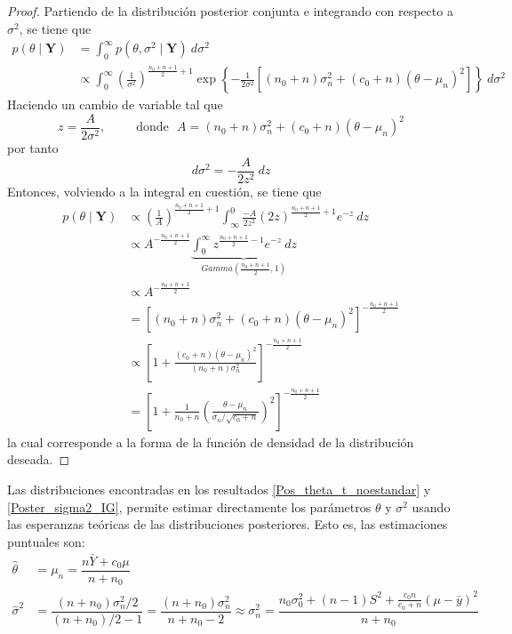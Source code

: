 \begin{proof}
Partiendo de la distribución posterior conjunta e integrando con respecto a $\sigma^2$, se tiene que
\begin{align*}
p(\theta \mid \mathbf{Y})&= \int_0^{\infty} p(\theta,\sigma^2 \mid \mathbf{Y}) \ d\sigma^2 \\
&\propto \int_0^{\infty} \left(\frac{1}{\sigma^2}\right)^{\frac{n_0+n+1}{2}+1}
\exp\left\{-\frac{1}{2\sigma^2}\left[(n_0+n)\sigma^2_n+(c_0+n)(\theta-\mu_n)^2\right]\right\} \ d\sigma^2
\end{align*}
Haciendo un cambio de variable tal que
\begin{equation*}
z=\frac{A}{2\sigma^2}, \ \ \ \ \ \ \ \ \ \ \ \text{donde} \ \ \ A=(n_0+n)\sigma^2_n+(c_0+n)(\theta-\mu_n)^2
\end{equation*}
por tanto
\begin{equation*}
d\sigma^2=-\frac{A}{2z^2} \ dz
\end{equation*}
Entonces, volviendo a la integral en cuestión, se tiene que
\begin{align*}
p(\theta \mid \mathbf{Y})& \propto
\left(\frac{1}{A}\right)^{\frac{n_0+n+1}{2}+1}\int_{\infty}^{0} \frac{-A}{2z^2} (2z)^{\frac{n_0+n+1}{2}+1}e^{-z} \ dz \\
&\propto A^{-\frac{n_0+n+1}{2}}\underbrace{\int_{0}^{\infty} z^{\frac{n_0+n+1}{2}-1}e^{-z}\ dz}_{Gamma\left(\frac{n_0+n+1}{2},1\right)}\\
&\propto A^{-\frac{n_0+n+1}{2}}\\
&= \left[(n_0+n)\sigma^2_n+(c_0+n)(\theta-\mu_n)^2\right]^{-\frac{n_0+n+1}{2}}\\
&\propto \left[1+\frac{(c_0+n)(\theta-\mu_n)^2}{(n_0+n)\sigma^2_n}\right]^{-\frac{n_0+n+1}{2}}\\
&=\left[1+\frac{1}{n_0+n}\left(\frac{\theta-\mu_n}{\sigma_n/\sqrt{c_0+n}}\right)^2\right]^{-\frac{n_0+n+1}{2}}
\end{align*}
la cual corresponde a la forma de la función de densidad de la distribución deseada.
\end{proof}

Las distribuciones encontradas en los resultados \ref{Pos_theta_t_noestandar} y \ref{Poster_sigma2_IG}, permite estimar directamente los parámetros $\theta$ y $\sigma^2$ usando las esperanzas teóricas de las distribuciones posteriores. Esto es, las estimaciones puntuales son:
\begin{align*}
\hat{\theta}&=\mu_n=\dfrac{n\bar{Y}+c_0\mu}{n+n_0}\\
\hat{\sigma}^2&=\dfrac{(n+n_0)\sigma^2_n/2}{(n+n_0)/2-1}=\dfrac{(n+n_0)\sigma^2_n}{n+n_0-2}\approx\sigma^2_n=\dfrac{n_0\sigma^2_0+(n-1)S^2+\frac{c_0n}{c_0+n}(\mu-\bar{y})^2}{n+n_0}
\end{align*}

